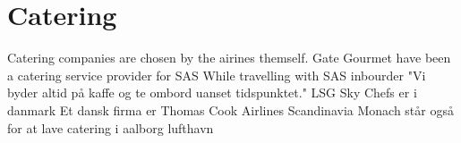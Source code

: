 \section{Catering} 
Catering companies are chosen by the airines themself.
Gate Gourmet have been a catering service provider for SAS
While travelling with SAS inbourder "Vi byder altid på kaffe og te ombord uanset tidspunktet."
LSG Sky Chefs er i danmark
Et dansk firma er Thomas Cook Airlines Scandinavia
Monach står også for at lave catering i aalborg lufthavn